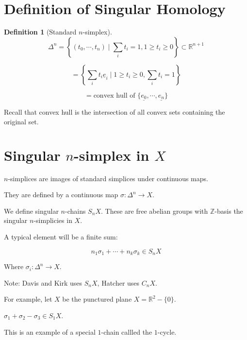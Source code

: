 \documentclass{article}
\theoremstyle{definition}
\newtheorem*{definition}{Definition}
\begin{document}
    \section*{Definition of Singular Homology}

    \begin{definition}
        [Standard \(n\)-simplex]

        \[
            \Delta^n = \left\{ (t_0, \cdots , t_n) \mid \sum_{i} t_i = 1, 1 \geq t_i \geq 0 \right\} \subset \mathbb{R}^{n+1}
        \]

        \[
            = \left\{ \sum_{i} t_i \underline{e}_i \mid 1 \geq t_i \geq 0, \sum_{i} t_i = 1 \right\} 
        \]

        \[
            = \text{convex hull of } \{ \underline{e_0}, \cdots , \underline{e_n} \} 
        \]

    \end{definition}

    Recall that convex hull is the intersection of all convex sets containing the original set.

    \section*{Singular \(n\)-simplex in \(X\)}

    \(n\)-simplices are images of standard simplices under continuous maps.

    They are defined by a continuous map \(\sigma : \Delta^n \to X\).


    We define singular \(n\)-chains \(S_n X\). These are free abelian groups with \(\mathbb{Z}\)-basis the singular \(n\)-simplicies in \(X\).

    A typical element will be a finite sum:

    \[
        n_1 \sigma_1 + \cdots + n_k \sigma_k \in S_n X
    \]

    Where \(\sigma_i : \Delta^n \to X\).

    Note: Davis and Kirk uses \(S_n X\), Hatcher uses \(C_n X\).

    For example, let \(X\) be the punctured plane \(X = \mathbb{R}^2 - \{ 0 \}\).

    \(\sigma_1 + \sigma_2 - \sigma_3 \in S_1 X\).


    This is an example of a special \(1\)-chain callled the \(1\)-cycle.
\end{document}
